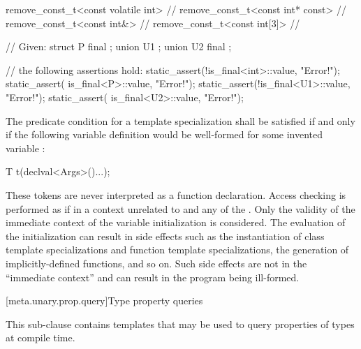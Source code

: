 \pnum
\enterexample
\begin{codeblock}
remove_const_t<const volatile int>  // 
remove_const_t<const int* const>    // 
remove_const_t<const int&>          // 
remove_const_t<const int[3]>        // 
\end{codeblock}
\exitexample

\pnum
\enterexample
\begin{codeblock}
// Given:
struct P final { };
union U1 { };
union U2 final { };

// the following assertions hold:
static_assert(!is_final<int>::value, "Error!");
static_assert( is_final<P>::value, "Error!");
static_assert(!is_final<U1>::value, "Error!");
static_assert( is_final<U2>::value, "Error!");
\end{codeblock}
\exitexample

\pnum
The predicate condition for a template specialization
 shall be satisfied if and only if the
following variable definition would be well-formed for some invented variable :

\begin{codeblock}
T t(declval<Args>()...);
\end{codeblock}

\enternote These tokens are never interpreted as a function declaration.
\exitnote Access checking is performed as if in a context unrelated to 
and any of the . Only the validity of the immediate context of the
variable initialization is considered. \enternote The evaluation of the
initialization can result in side effects such as the instantiation of class
template specializations and function template specializations, the generation
of implicitly-defined functions, and so on. Such side effects are not in the
``immediate context'' and can result in the program being ill-formed. \exitnote

[meta.unary.prop.query]{Type property queries}

\pnum
This sub-clause contains templates that may be used to query
properties of types at compile time.

